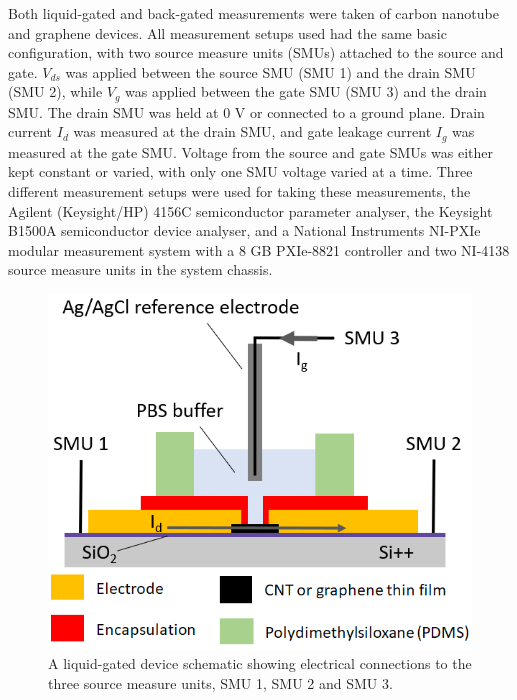 \documentclass[
  a4paper,
]{scrbook}
\begin{document}
Both liquid-gated and back-gated measurements were taken of carbon
nanotube and graphene devices. All measurement setups used had the same
basic configuration, with two source measure units (SMUs) attached to
the source and gate. \(V_{ds}\) was applied between the source SMU (SMU
1) and the drain SMU (SMU 2), while \(V_{g}\) was applied between the
gate SMU (SMU 3) and the drain SMU. The drain SMU was held at 0 V or
connected to a ground plane. Drain current \(I_{d}\) was measured at the
drain SMU, and gate leakage current \(I_{g}\) was measured at the gate
SMU. Voltage from the source and gate SMUs was either kept constant or
varied, with only one SMU voltage varied at a time. Three different
measurement setups were used for taking these measurements, the Agilent
(Keysight/HP) 4156C semiconductor parameter analyser, the Keysight
B1500A semiconductor device analyser, and a National Instruments NI-PXIe
modular measurement system with a 8 GB PXIe-8821 controller and two
NI-4138 source measure units in the system chassis.

\begin{figure}

{\centering \includegraphics{figures/ch4/liquid-gate-schematic.png}

}

\caption{\label{fig-liquid-gate}A liquid-gated device schematic showing
electrical connections to the three source measure units, SMU 1, SMU 2
and SMU 3.}

\end{figure}
\end{document}
